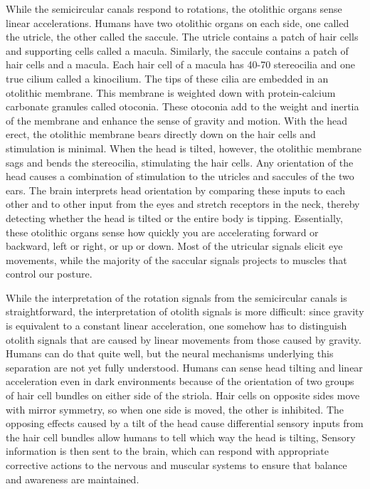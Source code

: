 While the semicircular canals respond to rotations, the otolithic organs sense linear accelerations. Humans have two otolithic organs on each side, one called the utricle, the other called the saccule. The utricle contains a patch of hair cells and supporting cells called a macula. Similarly, the saccule contains a patch of hair cells and a macula. Each hair cell of a macula has 40-70 stereocilia and one true cilium called a kinocilium. The tips of these cilia are embedded in an otolithic membrane. This membrane is weighted down with protein-calcium carbonate granules called otoconia. These otoconia add to the weight and inertia of the membrane and enhance the sense of gravity and motion. With the head erect, the otolithic membrane bears directly down on the hair cells and stimulation is minimal. When the head is tilted, however, the otolithic membrane sags and bends the stereocilia, stimulating the hair cells. Any orientation of the head causes a combination of stimulation to the utricles and saccules of the two ears. The brain interprets head orientation by comparing these inputs to each other and to other input from the eyes and stretch receptors in the neck, thereby detecting whether the head is tilted or the entire body is tipping. Essentially, these otolithic organs sense how quickly you are accelerating forward or backward, left or right, or up or down. Most of the utricular signals elicit eye movements, while the majority of the saccular signals projects to muscles that control our posture.

While the interpretation of the rotation signals from the semicircular canals is straightforward, the interpretation of otolith signals is more difficult: since gravity is equivalent to a constant linear acceleration, one somehow has to distinguish otolith signals that are caused by linear movements from those caused by gravity. Humans can do that quite well, but the neural mechanisms underlying this separation are not yet fully understood. Humans can sense head tilting and linear acceleration even in dark environments because of the orientation of two groups of hair cell bundles on either side of the striola. Hair cells on opposite sides move with mirror symmetry, so when one side is moved, the other is inhibited. The opposing effects caused by a tilt of the head cause differential sensory inputs from the hair cell bundles allow humans to tell which way the head is tilting, Sensory information is then sent to the brain, which can respond with appropriate corrective actions to the nervous and muscular systems to ensure that balance and awareness are maintained.

